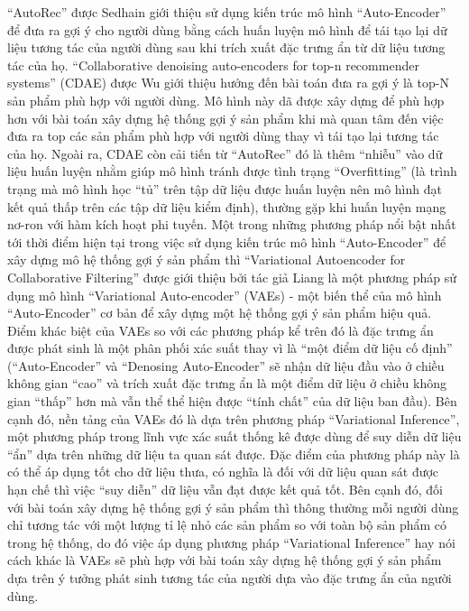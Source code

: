 ``AutoRec'' \cite{autorec} được Sedhain giới thiệu sử dụng kiến trúc mô hình ``Auto-Encoder'' để đưa ra gợi ý cho người dùng bằng cách huấn luyện mô hình để tái tạo lại dữ liệu tương tác của người dùng sau khi trích xuất đặc trưng ẩn từ dữ liệu tương tác của họ. ``Collaborative denoising auto-encoders for top-n recommender systems'' \cite{cdae} (CDAE) được Wu giới thiệu hướng đến bài toán đưa ra gợi ý là top-N sản phẩm phù hợp với người dùng. Mô hình này dã được xây dựng để phù hợp hơn với bài toán xây dựng hệ thống gợi ý sản phẩm khi mà quan tâm đến việc đưa ra top các sản phẩm phù hợp với người dùng thay vì tái tạo lại tương tác của họ. Ngoài ra, CDAE còn cải tiến từ ``AutoRec'' đó là thêm ``nhiễu'' vào dữ liệu huấn luyện nhằm giúp mô hình tránh được tình trạng ``Overfitting'' (là trình trạng mà mô hình học ``tủ'' trên tập dữ liệu được huấn luyện nên mô hình đạt kết quả thấp trên các tập dữ liệu kiểm định), thường gặp khi huấn luyện mạng nơ-ron với hàm kích hoạt phi tuyến.
Một trong những phương pháp nổi bật nhất tới thời điểm hiện tại trong việc sử dụng kiến trúc mô hình ``Auto-Encoder'' để xây dựng mô hệ thống gợi ý sản phẩm thì ``Variational Autoencoder for Collaborative Filtering''\cite{mvae} được giới thiệu bởi tác giả Liang là một phương pháp sử dụng mô hình ``Variational Auto-encoder'' (VAEs) - một biến thể của mô hình ``Auto-Encoder'' cơ bản để xây dựng một hệ thống gợi ý sản phẩm hiệu quả.
Điểm khác biệt của VAEs so với các phương pháp kể trên đó là đặc trưng ẩn được phát sinh là một phân phối xác suất thay vì là ``một điểm dữ liệu cố định'' (``Auto-Encoder'' và ``Denosing Auto-Encoder'' sẽ nhận dữ liệu đầu vào ở chiều không gian ``cao'' và trích xuất đặc trưng ẩn là một điểm dữ liệu ở chiều không gian ``thấp'' hơn mà vẫn thể thể hiện được ``tính chất'' của dữ liệu ban đầu). Bên cạnh đó, nền tảng của VAEs đó là dựa trên phương pháp ``Variational Inference'', một phương pháp trong lĩnh vực xác suất thống kê được dùng để suy diễn dữ liệu ``ẩn'' dựa trên những dữ liệu ta quan sát được. Đặc điểm của phương pháp này là có thể áp dụng tốt cho dữ liệu thưa, có nghĩa là đối với dữ liệu quan sát được hạn chế thì việc ``suy diễn'' dữ liệu vẫn đạt được kết quả tốt.
Bên cạnh đó, đối với bài toán xây dựng hệ thống gợi ý sản phẩm thì thông thường mỗi người dùng chỉ tương tác với một lượng tỉ lệ nhỏ các sản phẩm so với toàn bộ sản phẩm có trong hệ thống, do đó việc áp dụng phương pháp ``Variational Inference'' hay nói cách khác là VAEs sẽ phù hợp với bài toán xây dựng hệ thống gợi ý sản phẩm dựa trên ý tưởng phát sinh tương tác của người dựa vào đặc trưng ẩn của người dùng. 

